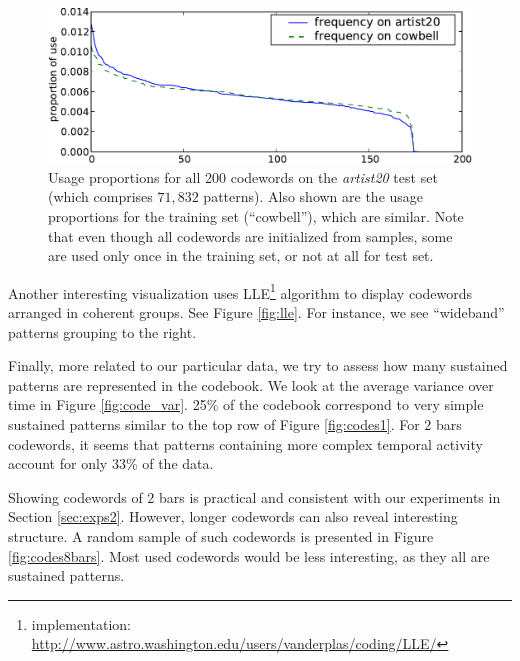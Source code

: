 \documentclass{article}
\begin{document}
\begin{figure}[bt]
\begin{center}
\includegraphics[width=.99\columnwidth]{freqs}
\end{center}
\caption{\small{Usage proportions for all 200 codewords 
on the {\it artist20} test set (which comprises $71,832$
patterns).  Also shown are the usage proportions for the training set (``cowbell''), 
which are similar.
Note that even though all codewords are initialized from samples, some
are used only once in the training set, or not at all for test set.
}}
\label{fig:freqs}
\end{figure}


Another interesting visualization uses LLE\footnote{implementation:
  \url{http://www.astro.washington.edu/users/vanderplas/coding/LLE/}}
algorithm \cite{Roweis2000} to display codewords arranged in
coherent groups. See Figure \ref{fig:lle}. For instance, we see
``wideband'' patterns grouping to the right.

Finally, more related to our particular data, we try to assess how many
sustained patterns are represented in the codebook. We look at
the average variance over time in Figure \ref{fig:code_var}.
25\% of the codebook correspond
to very simple sustained patterns similar to the top row of Figure
\ref{fig:codes1}. For $2$ bars codewords, it seems that patterns
containing more complex temporal activity account for only $33$\% of
the data.

Showing codewords of $2$ bars is practical and consistent with our experiments
in Section \ref{sec:exps2}. However, longer codewords can also reveal
interesting structure. A random sample of such codewords is presented
in Figure \ref{fig:codes8bars}. Most used codewords would be less interesting,
as they all are sustained patterns.
\end{document}
